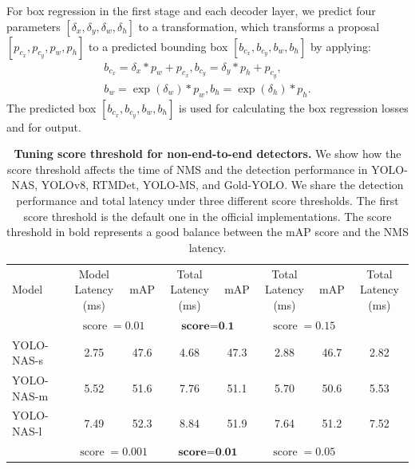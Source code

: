 \documentclass[runningheads]{llncs}
\begin{document}
For box regression in the first stage and each decoder layer, we predict four parameters $[\delta_x, \delta_y, \delta_w, \delta_h]$ to a transformation, which transforms a proposal $[p_{c_x}, p_{c_y}, p_w, p_h]$ to a predicted bounding box $[b_{c_x}, b_{c_y}, b_w, b_h]$ by applying:
\begin{equation}
\begin{aligned}
    b_{c_x} = \delta_x * p_w + p_{c_x}, b_{c_y} = \delta_y * p_h + p_{c_y}, \\
    b_w = \exp(\delta_w) * p_w, b_h = \exp(\delta_h) * p_h.
\end{aligned}
\end{equation}
The predicted box $[b_{c_x}, b_{c_y}, b_w, b_h]$ is used for calculating the box regression losses and for output.

\begin{table}[t]
  \centering
    \setlength{\tabcolsep}{4pt}
    \renewcommand{\arraystretch}{1.41}
    \tiny
  \caption{\textbf{Tuning score threshold for non-end-to-end detectors.} We show how the score threshold affects the time of NMS and the detection performance in YOLO-NAS, YOLOv8, RTMDet, YOLO-MS, and Gold-YOLO. We share the detection performance and total latency under three different score thresholds. The first score threshold is the default one in the official implementations. The score threshold in bold represents a good balance between the mAP score and the NMS latency.}
  \begin{tabular}{lc|cc|cc|cc}
    Model & \makecell{Model Latency\\(ms)} & mAP & \makecell{Total Latency\\(ms)} & mAP & \makecell{Total Latency\\(ms)} & mAP & \makecell{Total Latency\\(ms)} \\
    \shline
    \multicolumn{2}{c|}{Thresholds}  & \multicolumn{2}{c|}{\textit{$\operatorname{score}=0.01$}\protect\footnotemark} & \multicolumn{2}{c|}{$\operatorname{\textbf{score}}\textbf{=}\textbf{0.1}$} & \multicolumn{2}{c}{$\operatorname{score}=0.15$} \\
    \hline
    YOLO-NAS-s & 2.75 & 47.6 & 4.68 & 47.3 & 2.88 & 46.7 & 2.82 \\
    YOLO-NAS-m & 5.52 & 51.6 & 7.76 & 51.1 & 5.70 & 50.6 & 5.53 \\
    YOLO-NAS-l & 7.49 & 52.3 & 8.84 & 51.9 & 7.64 & 51.2 & 7.52 \\
    \shline
    \multicolumn{2}{c|}{Thresholds}  & \multicolumn{2}{c|}{\textit{$\operatorname{score}=0.001$}} & \multicolumn{2}{c|}{$\operatorname{\textbf{score}}\textbf{=}\textbf{0.01}$} & \multicolumn{2}{c}{$\operatorname{score}=0.05$} \\

\end{tabular}
\end{table}
\end{document}
